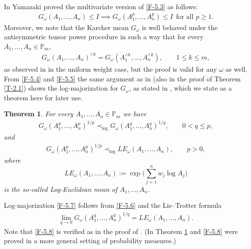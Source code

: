 \documentclass[11pt,reqno]{article}
\newtheorem{theorem}{Theorem}[section]
\numberwithin{equation}{section}
\def\bP{\mathbb{P}}
\begin{document}
In \cite[Theorem 3]{Ya} Yamazaki proved the multivariate version of \eqref{F-5.3} as follows:
\begin{align}\label{F-5.4}
G_\omega(A_1,\dots,A_n)\le I \implies G_\omega(A_1^p,\dots,A_n^p)\le I\ \ \mbox{for all $p\ge1$}.
\end{align}
Moreover, we note that the Karcher mean $G_\omega$ is well behaved under the antisymmetric tensor
power procedure in such a way that for every $A_1,\dots,A_n\in\bP_m$,
\begin{align}\label{F-5.5}
G_\omega(A_1,\dots,A_n)^{\wedge k}=G_\omega(A_1^{\wedge k},\dots,A_n^{\wedge k}),
\qquad1\le k\le m,
\end{align}
as observed in \cite[Theorem 4.4]{BK} in the uniform weight case, but the proof is valid for any $\omega$
as well. From \eqref{F-5.4} and \eqref{F-5.5} the same argument as in \cite{AH} (also in the proof of
Theorem \ref{T-2.1}) shows the log-majorization for $G_\omega$, as stated in \cite[Remark 3.8]{HP}, which
we state as a theorem here for later use.

\begin{theorem}\label{T-5.1}
For every $A_1,\dots,A_n\in\bP_m$ we have
\begin{align}\label{F-5.6}
G_\omega(A_1^p,\dots,A_n^p)^{1/p}\prec_{\log}G_\omega(A_1^q,\dots,A_n^q)^{1/q},
\qquad0<q\le p,
\end{align}
and
\begin{align}\label{F-5.7}
G_\omega(A_1^p,\dots,A_n^p)^{1/p}\prec_{\log}LE_\omega(A_1,\dots,A_n),\qquad p>0,
\end{align}
where
\[
LE_\omega(A_1,\dots,A_n):=\exp\Biggl(\sum_{j=1}^nw_j\log A_j\Biggr)
\]
is the so-called \emph{Log-Euclidean mean} of $A_1,\dots,A_n$.
\end{theorem}

Log-majorization \eqref{F-5.7} follows from \eqref{F-5.6} and the Lie--Trotter formula
\begin{align}\label{F-5.8}
\lim_{q\to0}G_\omega(A_1^q,\dots,A_n^q)^{1/q}=LE_\omega(A_1,\dots,A_n).
\end{align}
Note that \eqref{F-5.8} is verified as in the proof of \cite[Lemma 3.1]{FFS}. (In \cite{HL} Theorem \ref{T-5.1} and
\eqref{F-5.8} were proved in a more general setting of probability measures.)
\end{document}
